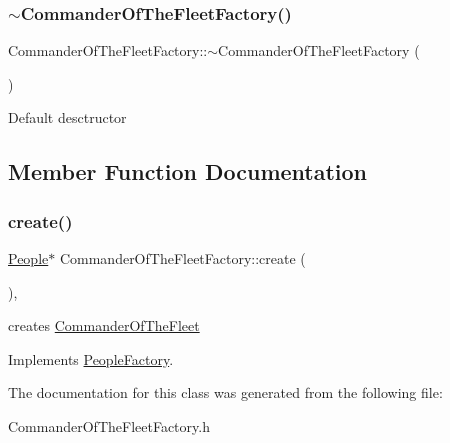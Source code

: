 \subsubsection{\texorpdfstring{$\sim$\+Commander\+Of\+The\+Fleet\+Factory()}{~CommanderOfTheFleetFactory()}}
{\footnotesize\ttfamily Commander\+Of\+The\+Fleet\+Factory\+::$\sim$\+Commander\+Of\+The\+Fleet\+Factory (\begin{DoxyParamCaption}{ }\end{DoxyParamCaption})\hspace{0.3cm}{\ttfamily [inline]}}

Default desctructor 

\subsection{Member Function Documentation}
\mbox{\label{classCommanderOfTheFleetFactory_aabbbbcb6c52f23e008b186e59aa5c84b}} 
\subsubsection{\texorpdfstring{create()}{create()}}
{\footnotesize\ttfamily \hyperlink{classPeople}{People}$\ast$ Commander\+Of\+The\+Fleet\+Factory\+::create (\begin{DoxyParamCaption}{ }\end{DoxyParamCaption})\hspace{0.3cm}{\ttfamily [inline]}, {\ttfamily [virtual]}}

creates \hyperlink{classCommanderOfTheFleet}{Commander\+Of\+The\+Fleet} 

Implements \hyperlink{classPeopleFactory}{People\+Factory}.



The documentation for this class was generated from the following file\+:\begin{DoxyCompactItemize}
\item 
Commander\+Of\+The\+Fleet\+Factory.\+h\end{DoxyCompactItemize}

